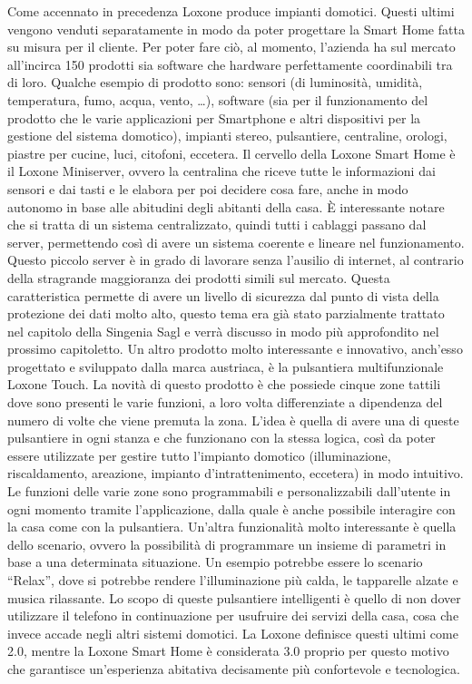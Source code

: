 Come accennato in precedenza Loxone produce impianti domotici. Questi ultimi vengono venduti separatamente in modo da poter progettare la Smart Home fatta su misura per il cliente. Per poter fare ciò, al momento, l’azienda ha sul mercato all’incirca 150 prodotti sia software che hardware perfettamente coordinabili tra di loro. Qualche esempio di prodotto sono: sensori (di luminosità, umidità, temperatura, fumo, acqua, vento, …), software (sia per il funzionamento del prodotto che le varie applicazioni per Smartphone e altri dispositivi per la gestione del sistema domotico), impianti stereo, pulsantiere, centraline, orologi, piastre per cucine, luci, citofoni, eccetera.
Il cervello della Loxone Smart Home è il Loxone Miniserver, ovvero la centralina che riceve tutte le informazioni dai sensori e dai tasti e le elabora per poi decidere cosa fare, anche in modo autonomo in base alle abitudini degli abitanti della casa. È interessante notare che si tratta di un sistema centralizzato, quindi tutti i cablaggi passano dal server, permettendo così di avere un sistema coerente e lineare nel funzionamento. Questo piccolo server è in grado di lavorare senza l’ausilio di internet, al contrario della stragrande maggioranza dei prodotti simili sul mercato. Questa caratteristica permette di avere un livello di sicurezza dal punto di vista della protezione dei dati molto alto, questo tema era già stato parzialmente trattato nel capitolo della Singenia Sagl e verrà discusso in modo più approfondito nel prossimo capitoletto. 
Un altro prodotto molto interessante e innovativo, anch’esso progettato e sviluppato dalla marca austriaca, è la pulsantiera multifunzionale Loxone Touch. La novità di questo prodotto è che possiede cinque zone tattili dove sono presenti le varie funzioni, a loro volta differenziate a dipendenza del numero di volte che viene premuta la zona. L’idea è quella di avere una di queste pulsantiere in ogni stanza e che funzionano con la stessa logica, così da poter essere utilizzate per gestire tutto l’impianto domotico (illuminazione, riscaldamento, areazione, impianto d’intrattenimento, eccetera) in modo intuitivo. Le funzioni delle varie zone sono programmabili e personalizzabili dall’utente in ogni momento tramite l’applicazione, dalla quale è anche possibile interagire con la casa come con la pulsantiera. Un’altra funzionalità molto interessante è quella dello scenario, ovvero la possibilità di programmare un insieme di parametri in base a una determinata situazione. Un esempio potrebbe essere lo scenario “Relax”, dove si potrebbe rendere l’illuminazione più calda, le tapparelle alzate e musica rilassante. Lo scopo di queste pulsantiere intelligenti è quello di non dover utilizzare il telefono in continuazione per usufruire dei servizi della casa, cosa che invece accade negli altri sistemi domotici. La Loxone definisce questi ultimi come 2.0, mentre la Loxone Smart Home è considerata 3.0 proprio per questo motivo che garantisce un’esperienza abitativa decisamente più confortevole e tecnologica. 

